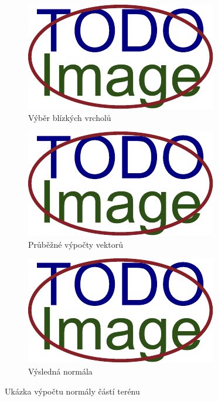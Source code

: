 \begin{figure}[H]
	\centering
	\begin{subfigure}{0.32\textwidth}
		\includegraphics[width=\textwidth]{obrazky-figures/placeholder.pdf}
		\caption{Výběr blízkých vrcholů}
		\label{fig:terén:normály:vektory}
	\end{subfigure}
	\hfill
	\begin{subfigure}{0.32\textwidth}
		\includegraphics[width=\textwidth]{obrazky-figures/placeholder.pdf}
		\caption{Průběžné výpočty vektorů}
		\label{fig:terén:normály:výpočet}
	\end{subfigure}
	\hfill
	\begin{subfigure}{0.32\textwidth}
		\includegraphics[width=\textwidth]{obrazky-figures/placeholder.pdf}
		\caption{Výsledná normála}
		\label{fig:terén:normály:výsledek}
	\end{subfigure}
	\caption{Ukázka výpočtu normály částí terénu}
	\label{fig:terén:normály}
\end{figure}

